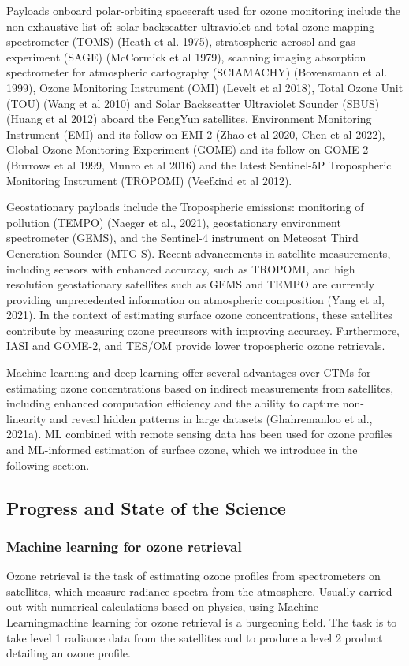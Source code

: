 \documentclass[gmd, manuscript]{copernicus}
\begin{document}
Payloads onboard polar-orbiting spacecraft used for ozone monitoring include the non-exhaustive list of: solar backscatter ultraviolet and total ozone mapping spectrometer (TOMS) (Heath et al. 1975), stratospheric aerosol and gas experiment (SAGE) (McCormick et al 1979), scanning imaging absorption spectrometer for atmospheric cartography (SCIAMACHY) (Bovensmann et al. 1999), Ozone Monitoring Instrument (OMI) (Levelt et al 2018), Total Ozone Unit (TOU) (Wang et al 2010) and Solar Backscatter Ultraviolet Sounder (SBUS) (Huang et al 2012) aboard the FengYun satellites, Environment Monitoring Instrument (EMI) and its follow on EMI-2 (Zhao et al 2020, Chen et al 2022), Global Ozone Monitoring Experiment (GOME) and its follow-on GOME-2 (Burrows et al 1999, Munro et al 2016) and the latest Sentinel-5P Tropospheric Monitoring Instrument (TROPOMI) (Veefkind et al 2012).

Geostationary payloads include the Tropospheric emissions: monitoring of pollution (TEMPO) (Naeger et al., 2021), geostationary environment spectrometer (GEMS), and the Sentinel-4 instrument on Meteosat Third Generation Sounder (MTG-S). Recent advancements in satellite measurements, including sensors with enhanced accuracy, such as TROPOMI, and high resolution geostationary satellites such as GEMS and TEMPO are currently providing unprecedented information on atmospheric composition (Yang et al, 2021). In the context of estimating surface ozone concentrations, these satellites contribute by measuring ozone precursors with improving accuracy. Furthermore, IASI and GOME-2, and TES/OM provide lower tropospheric ozone retrievals. 

Machine learning and deep learning offer several advantages over CTMs for estimating ozone concentrations based on indirect measurements from satellites, including enhanced computation efficiency and the ability to capture non-linearity and reveal hidden patterns in large datasets (Ghahremanloo et al., 2021a). ML combined with remote sensing data has been used for ozone profiles and ML-informed estimation of surface ozone, which we introduce in the following section.
\subsection{Progress and State of the Science}
\subsubsection{Machine learning for ozone retrieval}
Ozone retrieval is the task of estimating ozone profiles from spectrometers on satellites, which measure radiance spectra from the atmosphere. Usually carried out with numerical calculations based on physics, using Machine Learningmachine learning for ozone retrieval is a burgeoning field. The task is to take level 1 radiance data from the satellites and to produce a level 2 product detailing an ozone profile.
\end{document}
